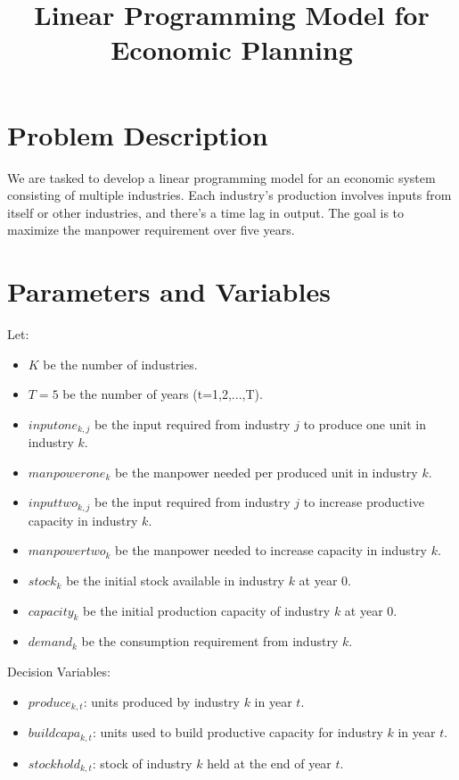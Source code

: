 \documentclass{article}
\begin{document}
\title{Linear Programming Model for Economic Planning}
\author{}
\date{}
\maketitle

\section*{Problem Description}

We are tasked to develop a linear programming model for an economic system consisting of multiple industries. Each industry's production involves inputs from itself or other industries, and there's a time lag in output. The goal is to maximize the manpower requirement over five years. 

\section*{Parameters and Variables}

Let:
\begin{itemize}
    \item $K$ be the number of industries.
    \item $T = 5$ be the number of years (t=1,2,...,T).
    \item $inputone_{k,j}$ be the input required from industry $j$ to produce one unit in industry $k$.
    \item $manpowerone_{k}$ be the manpower needed per produced unit in industry $k$.
    \item $inputtwo_{k,j}$ be the input required from industry $j$ to increase productive capacity in industry $k$.
    \item $manpowertwo_{k}$ be the manpower needed to increase capacity in industry $k$.
    \item $stock_{k}$ be the initial stock available in industry $k$ at year 0.
    \item $capacity_{k}$ be the initial production capacity of industry $k$ at year 0.
    \item $demand_{k}$ be the consumption requirement from industry $k$.
\end{itemize}

Decision Variables:
\begin{itemize}
    \item $produce_{k,t}$: units produced by industry $k$ in year $t$.
    \item $buildcapa_{k,t}$: units used to build productive capacity for industry $k$ in year $t$.
    \item $stockhold_{k,t}$: stock of industry $k$ held at the end of year $t$.
\end{itemize}
\end{document}
